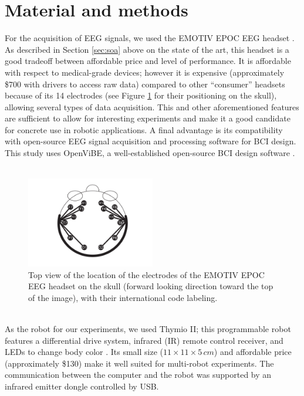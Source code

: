 \documentclass[smallextended]{svjour3}
\begin{document}
\section{Material and methods}
\label{sec:methods}
For the acquisition of EEG signals, we used the EMOTIV EPOC EEG headset \cite{stytsenko2011evaluation}. 
As described in Section \ref{sec:soa} above on the state of the art, this headset is a good tradeoff between affordable price and level of performance. 
It is affordable with respect to medical-grade devices; however it is expensive (approximately \$700 with drivers to access raw data) compared to other ``consumer'' headsets because of its 14 electrodes (see Figure \ref{fig:electrodes} for their positioning on the skull), allowing several types of data acquisition. 
This and other aforementioned features are sufficient to allow for interesting experiments and make it a good candidate for concrete use in robotic applications. A final advantage is its compatibility with open-source EEG signal acquisition and processing software for BCI design. This study uses OpenViBE, a well-established open-source BCI design software \cite{ov_publication}.\\
\\
\begin{figure}
\center
\includegraphics[width=0.5\textwidth]{figures/emotiv-electrodes.pdf}
\caption{Top view of the location of the electrodes of the EMOTIV EPOC EEG headset on the skull (forward looking direction toward the top of the image), with their international code labeling.} \label{fig:electrodes}
\end{figure}
\\
As the robot for our experiments, we used Thymio II; this programmable robot features a differential drive system, infrared (IR) remote control receiver, and LEDs to change body color \cite{Riedo-et-al-2013}. Its small size ($11 \times 11 \times 5\,\mathit{cm}$) and affordable price (approximately \$130) make it well suited for multi-robot experiments. 
The communication between the computer and the robot was supported by an infrared emitter dongle controlled by USB. 
\end{document}
